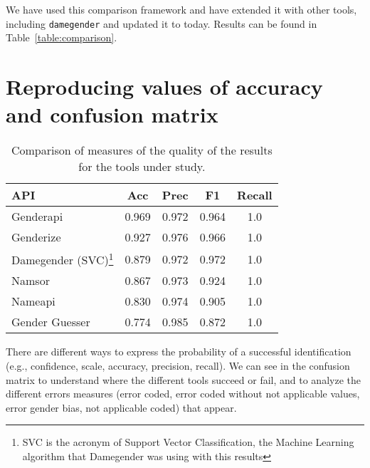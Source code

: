 \documentclass[a4paper]{article}
\begin{document}
We have used this comparison framework and have extended it with other tools, including \texttt{damegender} and updated it to today.
Results can be found in Table~\ref{table:comparison}.

\section{Reproducing values of accuracy and confusion matrix}

\begin{table}[t]
\footnotesize
\begin{tabular}[]{lcccc}
  \hline
  API & Acc & Prec & F1 & Recall\tabularnewline
\hline
Genderapi & 0.969 & 0.972 & 0.964 & 1.0\tabularnewline
Genderize & 0.927 & 0.976 & 0.966 & 1.0\tabularnewline
Damegender (SVC)\footnote{SVC is the acronym of Support Vector Classification, the Machine Learning algorithm that Damegender was using with this results} & 0.879 & 0.972 & 0.972 & 1.0\tabularnewline
Namsor & 0.867 & 0.973 & 0.924 & 1.0\tabularnewline
Nameapi & 0.830 & 0.974 & 0.905 & 1.0\tabularnewline
Gender Guesser & 0.774 & 0.985 & 0.872 & 1.0\tabularnewline
\hline
\end{tabular}
\caption{Comparison of measures of the quality of the results for the tools under study.}
\label{table:DifferentAccuraciesMeasures}
\end{table}

There are different ways to express the probability of a successful identification (e.g., confidence, scale, accuracy, precision, recall).
We can see in  the confusion matrix to understand where the different tools succeed or fail, and to analyze the different errors measures (error coded, error coded without not applicable values, error gender bias, not applicable coded) that appear.
\end{document}
